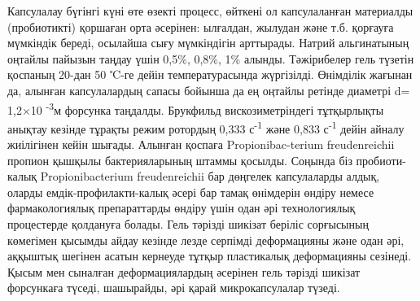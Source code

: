 Капсулалау бүгінгі күні өте өзекті процесс, өйткені ол капсулаланған
материалды (пробиотикті) қоршаған орта әсерінен: ылғалдан, жылудан және
т.б. қорғауға мүмкіндік береді, осылайша сығу мүмкіндігін арттырады.
Натрий альгинатының оңтайлы пайызын таңдау үшін 0,5\%, 0,8\%, 1\%
алынды. Тәжірибелер гель түзетін қоспаның 20-дан 50 ℃-ге дейін
температурасында жүргізілді. Өнімділік жағынан да, алынған капсулалардың
сапасы бойынша да ең оңтайлы ретінде диаметрі d= 1,2×10
\textsuperscript{-3}м форсунка таңдалды. Брукфильд вискозиметріндегі
тұтқырлықты анықтау кезінде тұрақты режим ротордың 0,333
с\textsuperscript{-1} және 0,833 с\textsuperscript{-1} дейін айналу
жиілігінен кейін шығады. Алынған қоспаға Propionibac-terium
freudenreichii пропион қышқылы бактерияларының штаммы қосылды. Соңында
біз пробиоти-калық Propionibacterium freudenreichii бар дөңгелек
капсулаларды алдық, оларды емдік-профилакти-калық әсері бар тамақ
өнімдерін өндіру немесе фармакологиялық препараттарды өндіру үшін одан
әрі технологиялық процестерде қолдануға болады. Гель тәрізді шикізат
беріліс сорғысының көмегімен қысымды айдау кезінде лезде серпімді
деформацияны және одан әрі, аққыштық шегінен асатын кернеуде тұтқыр
пластикалық деформацияны сезінеді. Қысым мен сыналған деформациялардың
әсерінен гель тәрізді шикізат форсункаға түседі, шашырайды, әрі қарай
микрокапсулалар түзеді.

